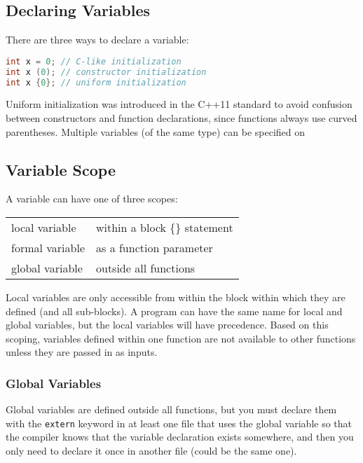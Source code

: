 \documentclass[10pt]{article}
\begin{document}
\subsection{Declaring Variables}

There are three ways to declare a variable:

\begin{lstlisting}[language=C++]
int x = 0; // C-like initialization
int x (0); // constructor initialization
int x {0}; // uniform initialization
\end{lstlisting}

Uniform initialization was introduced in the C++11 standard to avoid confusion between constructors and function declarations, since functions always use curved parentheses. Multiple variables (of the same type) can be specified on 

\subsection{Variable Scope}

A variable can have one of three scopes:

\begin{center}
\begin{tabular}{l l}
local variable & within a block \{\} statement\\
formal variable & as a function parameter\\
global variable & outside all functions\\
\end{tabular}
\end{center}

Local variables are only accessible from within the block within which they are defined (and all sub-blocks). A program can have the same name for local and global variables, but the local variables will have precedence. Based on this scoping, variables defined within one function are not available to other functions unless they are passed in as inputs.

\subsubsection{Global Variables}

Global variables are defined outside all functions, but you must declare them with the \texttt{extern} keyword in at least one file that uses the global variable so that the compiler knows that the variable declaration exists somewhere, and then you only need to declare it once in another file (could be the same one). 
\end{document}

